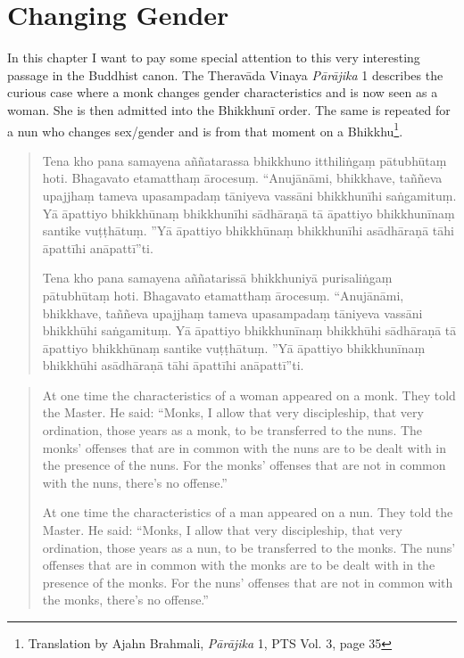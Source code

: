 \section{Changing Gender}

In this chapter I want to pay some special attention to this very interesting passage in the Buddhist canon. The Theravāda Vinaya {\em Pā­rāji­ka} 1 describes the curious case where a monk changes gender characteristics and is now seen as a woman. She is then admitted into the Bhikkhunī order. The same is repeated for a nun who changes sex/gender and is from that moment on a Bhikkhu\footnote{Translation by Ajahn Brahmali, {\em Pā­rāji­ka} 1, PTS Vol. 3, page 35}. 

\begin{quote}
Tena kho pana samayena aññatarassa bhikkhuno itthiliṅgaṃ pātubhūtaṃ hoti. Bhagavato etamatthaṃ ārocesuṃ. “Anujānāmi, bhikkhave, taññeva upajjhaṃ tameva upasampadaṃ tāniyeva vassāni bhikkhunīhi saṅgamituṃ. Yā āpattiyo bhikkhūnaṃ bhikkhunīhi sādhāraṇā tā āpattiyo bhikkhunīnaṃ santike vuṭṭhātuṃ. ”Yā āpattiyo bhikkhūnaṃ bhikkhunīhi asādhāraṇā tāhi āpattīhi anāpattī”ti.

Tena kho pana samayena aññatarissā bhikkhuniyā purisaliṅgaṃ pātubhūtaṃ hoti. Bhagavato etamatthaṃ ārocesuṃ. “Anujānāmi, bhikkhave, taññeva upajjhaṃ tameva upasampadaṃ tāniyeva vassāni bhikkhūhi saṅgamituṃ. Yā āpattiyo bhikkhunīnaṃ bhikkhūhi sādhāraṇā tā āpattiyo bhikkhūnaṃ santike vuṭṭhātuṃ. ”Yā āpattiyo bhikkhunīnaṃ bhikkhūhi asādhāraṇā tāhi āpattīhi anāpattī”ti.
\end{quote}

\begin{quote}
At one time the characteristics of a woman appeared on a monk. They told the Master. He said: “Monks, I allow that very discipleship, that very ordination, those years as a monk, to be transferred to the nuns. The monks’ offenses that are in common with the nuns are to be dealt with in the presence of the nuns. For the monks’ offenses that are not in common with the nuns, there’s no offense.”

At one time the characteristics of a man appeared on a nun. They told the Master. He said: “Monks, I allow that very discipleship, that very ordination, those years as a nun, to be transferred to the monks. The nuns’ offenses that are in common with the monks are to be dealt with in the presence of the monks. For the nuns’ offenses that are not in common with the monks, there’s no offense.”
\end{quote}


